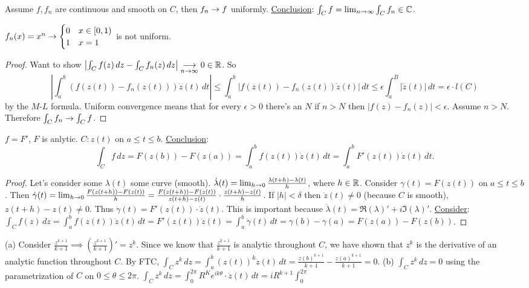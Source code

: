 \documentclass[]{article}
\begin{document}
\begin{proposition}
	Assume $f,f_n$ are continuous and smooth on $C$, then $f_n \rightarrow f$ uniformly. \underline{Conclusion}: $\int_C f = \lim_{n\rightarrow\infty} \int_C f_n \in \mathbb{C}$.
\end{proposition}
\begin{example}
	$f_n(x) = x^n \rightarrow \begin{cases} 0 & x\in[0,1) \\ 1 & x=1 \end{cases}$ is not uniform.
\end{example}
\begin{proof}
	Want to show $\left| \int_C f(z) \, dz - \int_C f_n(z) \, dz \right| \underset{n\rightarrow\infty}{\longrightarrow} 0\in\mathbb{R}$. So $$\left| \int_a^b (f(z(t)) - f_n(z(t)) ) \dot{z}(t) \, dt \right| \leq \int_a^b | f(z(t)) - f_n(z(t)) \dot{z}(t) | \, dt \leq \epsilon\int_a^B |\dot{z}(t) | \, dt = \epsilon \cdot l(C)$$ by the $M$-$L$ formula. Uniform convergence means that for every $\epsilon>0$ there's an $N$ if $n>N$ then $|f(z)-f_n(z)|<\epsilon$. Assume $n>N$. Therefore $\int_C f_n \rightarrow \int_C f$.
\end{proof}
\begin{proposition}
	 $f=F'$, $F$ is anlytic. $C:z(t)$ on $a\leq t \leq b$. \underline{Conclusion}: $$\int_C f \, dz = F(z(b)) - F(z(a)) = \int_a^b f(z(t)) \dot{z}(t) \, dt = \int_a^b F'(z(t)) \dot{z}(t) \, dt.$$
\end{proposition}
\begin{proof}
	Let's consider some $\lambda(t)$ some curve (smooth). $\dot{\lambda}(t) = \lim_{h\rightarrow0} \frac{\lambda(t+h) - \lambda(t)}{h}$, where $h\in\mathbb{R}$.
	Consider $\gamma(t) = F(z(t))$ on $a\leq t \leq b$. Then $\dot{\gamma}(t) = \lim_{h\rightarrow 0} \frac{F(z(t+h)) - F(z(t))}{h} = \frac{F(z(t+h)) - F(z(t))}{z(t+h)-z(t)} \cdot \frac{z(t+h) - z(t)}{h} $.
	If $|h|<\delta$ then $\dot{z}(t) \neq 0$ (because $C$ is smooth), $z(t+h) - z(t) \neq 0$. Thus $\dot{\gamma}(t) = F'(z(t)) \cdot \dot{z}(t)$. This is important because $\dot{\lambda}(t) = \Re(\lambda)' + i\Im(\lambda)'$.
	\underline{Consider}: $\int_C f(z) \, dz = \int_a^b f(z(t)) \dot{z}(t) \, dt = F'(z(t))\dot{z}(t) = \int_a^b \dot{\gamma}(t) \, dt = \gamma(b)-\gamma(a) = F(z(a))-F(z(b))$.
\end{proof}

\begin{example}
	 (a) Consider $\frac{z^{k+1}}{k+1} \implies \left( \frac{z^{k+1}}{k+1} \right)' = z^k$. Since we know that $\frac{z^{k+1}}{k+1}$ is analytic throughout $C$, we have shown that $z^k$ is the derivative of an analytic function throughout $C$. By FTC, $\int_C z^k \, dz = \int_a^b (z(t))^k \dot{z}(t) \, dt = \frac{z(b)^{k+1}}{k+1} - \frac{z(a)^{k+1}}{k+1} = 0$.
	(b) $\int_C z^k \, dz = 0$ using the parametrization of $C$ on $0\leq \theta \leq 2\pi$. $\int_C z^k \, dz = \int_0^{2\pi} R^K e^{ik\theta} \cdot \dot{z}(t) \, dt = i R^{k+1} \int_0^{2\pi} $
\end{example}
\end{document}
